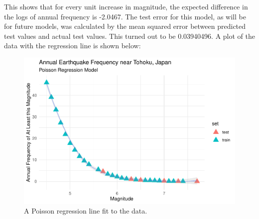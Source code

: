This shows that for every unit increase in magnitude, the expected difference in the logs of annual frequency is -2.0467.  The test error for this model, as will be for future models, was calculated by the mean squared error between predicted test values and actual test values.  This turned out to be 0.03940496.  A plot of the data with the regression line is shown below:


\begin{figure}[H]
    \center
    \includegraphics[width=0.75\linewidth]{Appendix_eq_files/figure-latex/unnamed-chunk-3-1.pdf}
    \caption{\footnotesize{A Poisson regression line fit to the data.}}
    \label{tohoku_unfit}
\end{figure}

